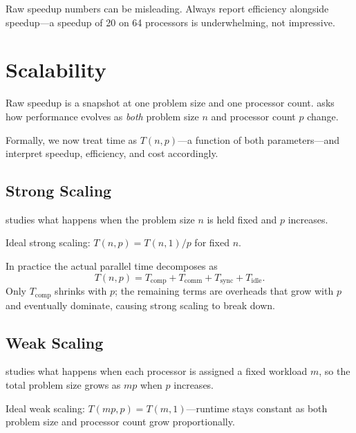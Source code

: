 \begin{pppitfall}
Raw speedup numbers can be misleading. Always report efficiency alongside
speedup---a speedup of 20 on 64 processors is underwhelming, not impressive.
\end{pppitfall}

\section{Scalability}

Raw speedup is a snapshot at one problem size and one processor count.
 asks how performance evolves as \emph{both} problem
size $n$ and processor count $p$ change.

Formally, we now treat time as $T(n, p)$---a function of both parameters---and
interpret speedup, efficiency, and cost accordingly.

\subsection{Strong Scaling}

 studies what happens when the problem size $n$ is
held fixed and $p$ increases.

\begin{ppdefn}
Ideal strong scaling: $T(n, p) = T(n, 1)/p$ for fixed $n$.
\end{ppdefn}

In practice the actual parallel time decomposes as
\[
  T(n, p) = T_{\text{comp}} + T_{\text{comm}} + T_{\text{sync}} + T_{\text{idle}}.
\]
Only $T_{\text{comp}}$ shrinks with $p$; the remaining terms are overheads that
grow with $p$ and eventually dominate, causing strong scaling to break down.

\subsection{Weak Scaling}

 studies what happens when each processor is assigned a
fixed workload $m$, so the total problem size grows as $mp$ when $p$ increases.

\begin{ppdefn}
Ideal weak scaling: $T(mp, p) = T(m, 1)$---runtime stays constant as both
problem size and processor count grow proportionally.
\end{ppdefn}

